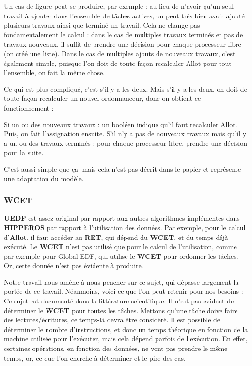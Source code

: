 		Un cas de figure peut se produire, par exemple : au lieu de n'avoir qu'un seul travail à ajouter dans 
		l'ensemble de tâches actives, on peut très bien avoir ajouté plusieurs travaux ainsi que terminé un travail.
		Cela ne change pas fondamentalement le calcul : dans le cas de multiples travaux terminés et pas de travaux nouveaux, 
		il suffit de prendre une décision pour chaque processeur libre (on créé une liste).
		Dans le cas de multiples ajouts de nouveaux travaux, c'est également simple, puisque l'on 
		doit de toute façon recalculer Allot pour tout l'ensemble, on fait la même chose. 
		
		Ce qui est plus compliqué, c'est s'il y a les deux. Mais s'il y a les deux, on doit 
		de toute façon recalculer un nouvel ordonnanceur, donc on obtient ce fonctionnement :
		
		Si un ou des nouveaux travaux : un booléen indique qu'il faut recalculer Allot. Puis, 
		on fait l'assignation ensuite.
		S'il n'y a pas de nouveaux travaux mais qu'il y a un ou des travaux terminés :
		pour chaque processeur libre, prendre une décision pour la suite.\newline
		
		C'est aussi simple que ça, mais cela n'est pas décrit dans le papier et représente une 
		adaptation du modèle.
	
	
		
	\subsubsection{WCET}
		\textbf{UEDF} est assez original par rapport aux autres algorithmes implémentés dans \textbf{HIPPEROS} 
		par rapport à l'utilisation des données. Par exemple, pour le calcul d'\textbf{Allot}, il faut accéder 
		au \textbf{RET}, qui dépend du \textbf{WCET}, et du temps déjà exécuté. Le \textbf{WCET} n'est pas 
		utilisé que pour le calcul de l'utilisation, comme par exemple pour Global EDF, qui utilise 
		le \textbf{WCET }pour ordonner les tâches. Or, cette donnée n'est pas évidente à produire. \newline
		
		Notre travail nous amène à nous pencher sur ce sujet, qui dépasse largement la portée de ce travail. 
		Néanmoins, voici ce que l'on peut retenir pour nos besoins :\\
		Ce sujet est documenté dans la littérature scientifique. Il n'est pas évident de déterminer le 
		\textbf{WCET} pour toutes les tâches. Mettons qu'une tâche doive faire des lectures/écritures, 
		ce temps-là devra être considéré. Il est possible de déterminer le nombre d'instructions, 
		et donc un temps théorique en fonction de la machine utilisée pour l'exécuter, mais cela dépend 
		parfois de l'exécution. En effet, certaines opérations, en fonction des données, ne vont pas prendre 
		le même temps, or, ce que l'on cherche à déterminer et le pire des cas.\newline
	
